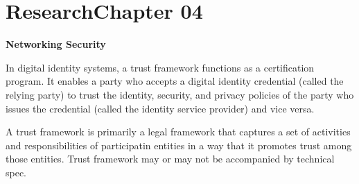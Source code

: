 \documentclass[../CIT288SecurityResearchNotebook.tex]{subfiles}
\begin{document}

\chapter[Research Ch. 04]{Research\linebreak[1] Chapter 04 \hspace*{\fill}{\date}}
\noindent\textbf{{Networking Security} }                             


In digital identity systems, a trust framework functions as a certification 
program. It enables a party who accepts a digital identity credential (called 
the relying party) to trust the identity, security, and privacy policies of 
the party who issues the credential (called the identity service provider) 
and vice versa.

A trust framework is primarily a legal framework that captures a set 
of activities and responsibilities of participatin entities in a 
way that it promotes trust among those entities. Trust framework 
may or may not be accompanied by technical spec.

\end{document}
